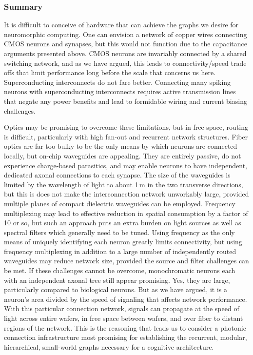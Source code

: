 \subsubsection{Summary}
It is difficult to conceive of hardware that can achieve the graphs we desire for neuromorphic computing. One can envision a network of copper wires connecting CMOS neurons and synapses, but this would not function due to the capacitance arguments presented above. CMOS neurons are invariably connected by a shared switching network, and as we have argued, this leads to connectivity/speed trade offs that limit performance long before the scale that concerns us here. Superconducting interconnects do not fare better. Connecting many spiking neurons with superconducting interconnects requires active transmission lines that negate any power benefits and lead to formidable wiring and current biasing challenges. 

Optics may be promising to overcome these limitations, but in free space, routing is difficult, particularly with high fan-out and recurrent network structures. Fiber optics are far too bulky to be the only means by which neurons are connected locally, but on-chip waveguides are appealing. They are entirely passive, do not experience charge-based parasitics, and may enable neurons to have independent, dedicated axonal connections to each synapse. The size of the waveguides is limited by the wavelength of light to about 1\,\textmu m in the two transverse directions, but this is does not make the interconnection network unworkably large, provided multiple planes of compact dielectric waveguides can be employed. Frequency multiplexing may lead to effective reduction in spatial consumption by a factor of 10 or so, but such an approach puts an extra burden on light sources as well as spectral filters which generally need to be tuned. Using frequency as the only means of uniquely identifying each neuron greatly limits connectivity, but using frequency multiplexing in addition to a large number of independently routed waveguides may reduce network size, provided the source and filter challenges can be met. If these challenges cannot be overcome, monochromatic neurons each with an independent axonal tree still appear promising. Yes, they are large, particularly compared to biological neurons. But as we have argued, it is a neuron's area divided by the speed of signaling that affects network performance. With this particular connection network, signals can propagate at the speed of light across entire wafers, in free space between wafers, and over fiber to distant regions of the network. This is the reasoning that leads us to consider a photonic connection infrastructure most promising for establishing the recurrent, modular, hierarchical, small-world graphs necessary for a cognitive  architecture. 